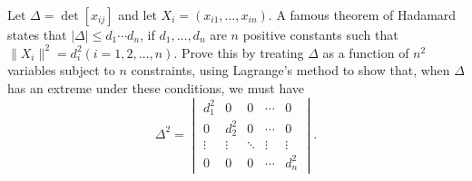 \begin{problembox}
Let \(\Delta = \det [x_{ij}]\) and let \(X_i = (x_{i1}, \ldots, x_{in})\). A famous theorem of Hadamard states that \(|\Delta| \leq d_1 \cdots d_n\), if \(d_1, \ldots, d_n\) are \(n\) positive constants such that \(\| X_i \|^2 = d_i^2 (i = 1, 2, \ldots, n)\). Prove this by treating \(\Delta\) as a function of \(n^2\) variables subject to \(n\) constraints, using Lagrange's method to show that, when \(\Delta\) has an extreme under these conditions, we must have
\[\Delta^2 = 
\begin{vmatrix}
d_1^2 & 0 & 0 & \cdots & 0 \\
0 & d_2^2 & 0 & \cdots & 0 \\
\vdots & \vdots & \ddots & \vdots & \vdots \\
0 & 0 & 0 & \cdots & d_n^2
\end{vmatrix}.\]
\end{problembox}